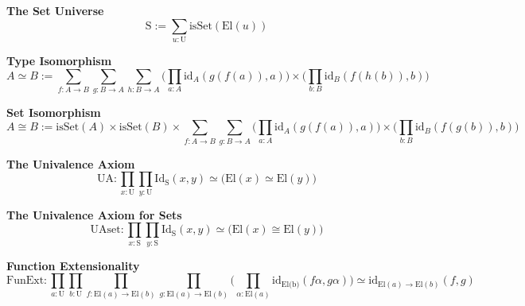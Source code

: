 \textbf{The Set Universe}
$$\text{S} := \sum_{u : \text{U}} \text{isSet}(\text{El}(u))$$

\textbf{Type Isomorphism}
$$A \simeq B := \sum_{f :A \to B}\sum_{g :B \to A}\sum_{h :B \to A}\Big(\prod_{a : A} \text{id}_{A}(g(f(a)),a) \Big) \times \Big(\prod_{b : B} \text{id}_{B}(f(h(b)),b) \Big)$$

\textbf{Set Isomorphism}
$$A \cong B := \text{isSet}(A) \times \text{isSet}(B)\times\sum_{f :A \to B}\sum_{g :B \to A}\Big(\prod_{a : A} \text{id}_{A}(g(f(a)),a) \Big) \times \Big(\prod_{b : B} \text{id}_{B}(f(g(b)),b) \Big)$$

\textbf{The Univalence Axiom}
$$\text{UA}: \prod_{x : \text{U}} \prod_{y : \text{U}} \text{Id}_{\text{S}}(x,y) \simeq \Big(\text{El}(x) \simeq \text{El}(y)\Big)$$

\textbf{The Univalence Axiom for Sets}
$$\text{UAset}: \prod_{x : \text{S}} \prod_{y : \text{S}} \text{Id}_{\text{S}}(x,y) \simeq \Big(\text{El}(x) \cong \text{El}(y)\Big)$$

\textbf{Function Extensionality}
$$\text{FunExt}: \prod_{a : \text{U}} \prod_{b : \text{U}} \prod_{f : \text{El}(a) \to \text{El}(b)} \prod_{g : \text{El}(a) \to \text{El}(b)}\Big( \prod_{\alpha : \text{El}(a)}\text{id}_{\text{El(b)}}(f\alpha,g\alpha)\Big) \simeq \text{id}_{\text{El}(a) \to \text{El}(b)}(f,g)$$



